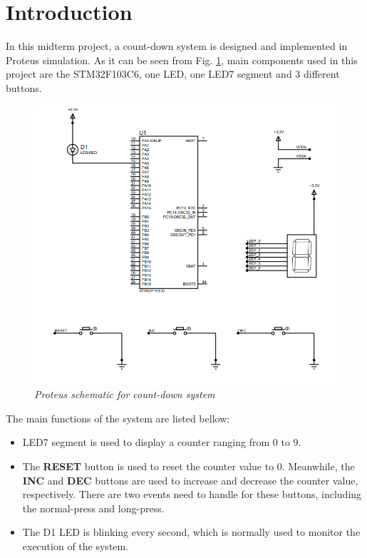 
\section{Introduction}
In this midterm project, a count-down system is designed and implemented in Proteus simulation. As it can be seen from Fig. \ref{project_intro1}, main components used in this project are the STM32F103C6, one LED, one LED7 segment and 3 different buttons.

\begin{figure}[!htp]
    \centering
    \includegraphics[width=5in]{source/picture/midterm/midtermschematic.PNG}
    \caption{\textit{Proteus schematic for count-down system}}
    \label{project_intro1}
\end{figure}

The main functions of the system are listed bellow:
\begin{itemize}
    \item LED7 segment is used to display a counter ranging from 0 to 9.
    \item The \textbf{RESET} button is used to reset the counter value to 0. Meanwhile, the \textbf{INC} and \textbf{DEC} buttons are used to increase and decrease the counter value, respectively. There are two events need to handle for these buttons, including the normal-press and long-press.
    \item The D1 LED is blinking every second, which is normally used to monitor the execution of the system.
\end{itemize}

